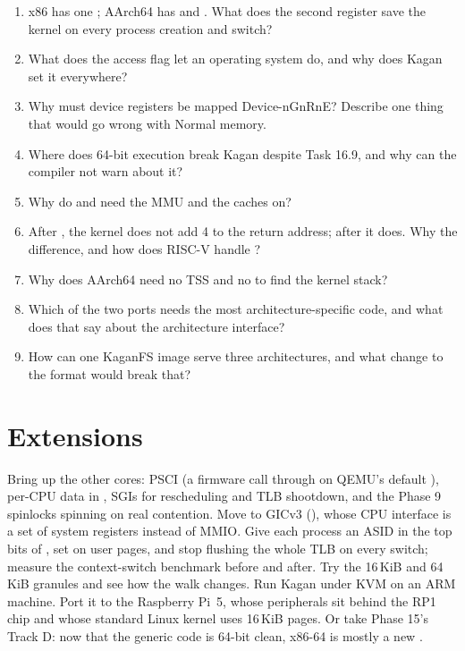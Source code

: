 \documentclass[11pt,a4paper]{article}
\begin{document}
\begin{questionbox}
\begin{enumerate}
  \item x86 has one ; AArch64 has  and . What does the second register save the kernel on every process creation and switch?
  \item What does the access flag let an operating system do, and why does Kagan set it everywhere?
  \item Why must device registers be mapped Device-nGnRnE? Describe one thing that would go wrong with Normal memory.
  \item Where does 64-bit execution break Kagan despite Task 16.9, and why can the compiler not warn about it?
  \item Why do  and  need the MMU and the caches on?
  \item After , the kernel does not add 4 to the return address; after  it does. Why the difference, and how does RISC-V handle ?
  \item Why does AArch64 need no TSS and no  to find the kernel stack?
  \item Which of the two ports needs the most architecture-specific code, and what does that say about the architecture interface?
  \item How can one KaganFS image serve three architectures, and what change to the format would break that?
\end{enumerate}
\end{questionbox}

\section{Extensions}

Bring up the other cores: PSCI  (a firmware call through  on QEMU's default ),
per-CPU data in , SGIs for rescheduling and TLB shootdown, and the Phase 9 spinlocks spinning
on real contention. Move to GICv3 (), whose CPU interface is a set of system registers instead of
MMIO. Give each process an ASID in the top bits of , set  on user pages, and stop flushing the
whole TLB on every switch; measure the context-switch benchmark before and after. Try the 16\,KiB and 64\,KiB granules
and see how the walk changes. Run Kagan under KVM on an ARM machine. Port it to the Raspberry Pi~5, whose
peripherals sit behind the RP1 chip and whose standard Linux kernel uses 16\,KiB pages. Or take Phase 15's Track D: now that the
generic code is 64-bit clean, x86-64 is mostly a new .
\end{document}
